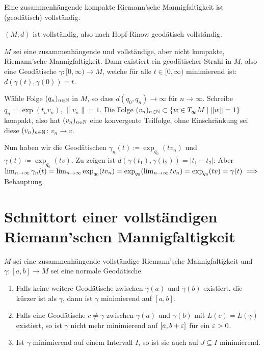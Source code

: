 \documentclass[a4paper,twoside,DIV15,BCOR12mm]{scrbook}
\renewcommand{\da}{\coloneqq}
\begin{document}
\begin{korrolar}
Eine zusammenhängende kompakte Riemann’sche Mannigfaltigkeit ist (geodätisch) vollständig.
\end{korrolar}

\begin{beweis}
$(M,d)$ ist vollständig, also nach Hopf-Rinow geodätisch vollständig.
\end{beweis}

\begin{korrolar}
$M$ sei eine zusammenhängende und vollständige, aber nicht kompakte, Riemann’sche Mannigfaltigkeit. Dann existiert ein geodätischer Strahl in $M$, also eine Geodätische $\gamma:[0,\infty)\to M$, welche für alle $t\in [0,\infty)$ minimierend ist: $d(\gamma(t),\gamma(0)) = t$.
\end{korrolar}

\begin{beweis}
Wähle Folge $(q_n)_{n\in\mathbb{N}}$ in $M$, so dass $d(q_0,q_n)\to \infty$ für $n\to\infty$. Schreibe $q_n = \exp(t_n v_n)$, $\|v_n\|=1$. Die Folge $(v_n)_{n\in\mathbb{N}} \subset \{ w \in T_{q_0}M\mid \|w\|=1\}$ kompakt, also hat $(v_n)_{n\in\mathbb{N}}$ eine konvergente Teilfolge, ohne Einschränkung sei diese $(v_n)_{n\in \mathbb{N}}$: $v_n \to v$.

Nun haben wir die Geodätischen $\gamma_n(t) \da \exp_{q_0}(tv_n)$ und  $\gamma(t) \da \exp_{q_0}(tv)$. Zu zeigen ist $d(\gamma(t_1), \gamma(t_2)) = |t_1 - t_2|$: Aber $\lim_{n\to\infty} \gamma_n(t) = \lim_{n\to\infty} \exp_{q_0}(tv_n) = \exp_{q_0}(\lim_{n\to\infty}tv_n) = \exp_{q_0}(tv) = \gamma(t) \implies$ Behauptung.
\end{beweis}

\section{Schnittort einer vollständigen Riemann’schen Mannigfaltigkeit}

\begin{lemma}
$M$ sei eine zusammenhängende vollständige Riemann’sche Mannigfaltigkeit und $\gamma:[a,b]\to M$ sei eine normale Geodätische.

\begin{enumerate}
\item Falls keine weitere Geodätische zwischen $\gamma(a)$ und $\gamma(b)$ existiert, die kürzer ist als $\gamma$, dann ist $\gamma$ minimierend auf $[a,b]$.
\item Falls eine Geodätische $c\ne \gamma$ zwischen $\gamma(a)$ und $\gamma(b)$ mit $L(c)=L(\gamma)$ existiert, so ist $\gamma$ nicht mehr minimierend auf $[a,b+\varepsilon]$ für ein $\varepsilon >0$.
\item Ist $\gamma$ minimierend auf einem Intervall $I$, so ist sie auch auf $J\subseteq I$ minimierend.
\end{enumerate}
\end{lemma}
\end{document}
